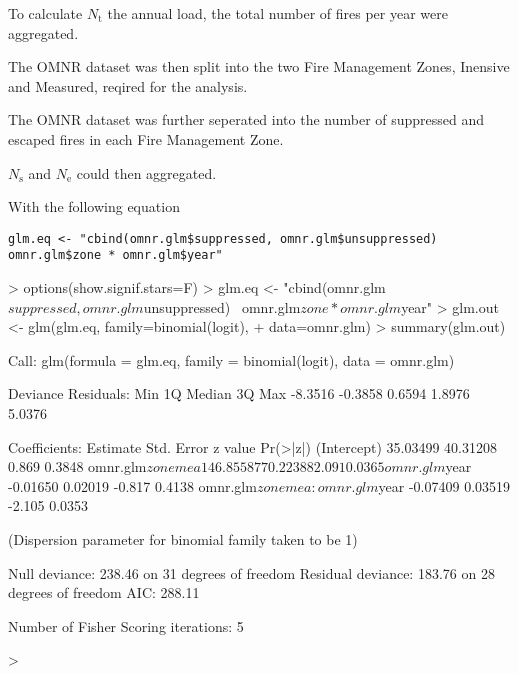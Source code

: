 \documentclass{article}
\begin{document}
\begin{spacing}{1.5}
\noindent To calculate $N_{\mathrm{t}}$ the annual load, the total number of fires per year were aggregated.


\noindent The OMNR dataset was then split into the two Fire Management Zones, Inensive and Measured, reqired for the analysis.


\noindent The OMNR dataset was further seperated into the number of suppressed and escaped fires in each Fire Management Zone.


\noindent $N_{\mathrm{s}}$ and $N_{\mathrm{e}}$ could then aggregated.




With the following equation

\noindent \texttt{glm.eq <- "cbind(omnr.glm\$suppressed, omnr.glm\$unsuppressed)\\
 omnr.glm\$zone * omnr.glm\$year"}

\backsim
\begin{Schunk}
\begin{Sinput}
> options(show.signif.stars=F)
> glm.eq <- "cbind(omnr.glm$suppressed, omnr.glm$unsuppressed)~ omnr.glm$zone * omnr.glm$year"
> glm.out <- glm(glm.eq, family=binomial(logit),
+                data=omnr.glm)
> summary(glm.out)
\end{Sinput}
\begin{Soutput}
Call:
glm(formula = glm.eq, family = binomial(logit), data = omnr.glm)

Deviance Residuals: 
    Min       1Q   Median       3Q      Max  
-8.3516  -0.3858   0.6594   1.8976   5.0376  

Coefficients:
                                Estimate Std. Error z value Pr(>|z|)
(Intercept)                     35.03499   40.31208   0.869   0.3848
omnr.glm$zonemea               146.85587   70.22388   2.091   0.0365
omnr.glm$year                   -0.01650    0.02019  -0.817   0.4138
omnr.glm$zonemea:omnr.glm$year  -0.07409    0.03519  -2.105   0.0353

(Dispersion parameter for binomial family taken to be 1)

    Null deviance: 238.46  on 31  degrees of freedom
Residual deviance: 183.76  on 28  degrees of freedom
AIC: 288.11

Number of Fisher Scoring iterations: 5
\end{Soutput}
\begin{Sinput}
> 
\end{Sinput}
\end{Schunk}


\end{spacing}
\end{document}
